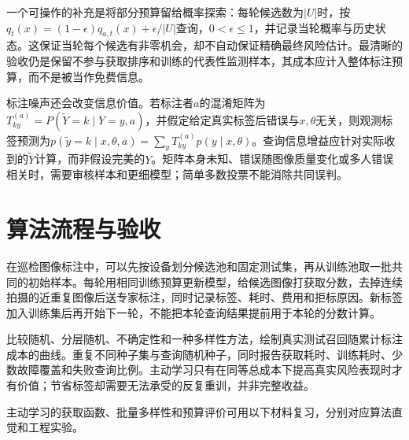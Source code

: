 一个可操作的补充是将部分预算留给概率探索：每轮候选数为$|U|$时，按$q_t(x)=(1-\epsilon)q_{a,t}(x)+\epsilon/|U|$查询，$0<\epsilon\leq1$，并记录当轮概率与历史状态。这保证当轮每个候选有非零机会，却不自动保证精确最终风险估计。最清晰的验收仍是保留不参与获取排序和训练的代表性监测样本，其成本应计入整体标注预算，而不是被当作免费信息。

标注噪声还会改变信息价值。若标注者$a$的混淆矩阵为$T^{(a)}_{ky}=P(\widetilde Y=k\mid Y=y,a)$，并假定给定真实标签后错误与$x,\theta$无关，则观测标签预测为$p(\widetilde y=k\mid x,\theta,a)=\sum_yT^{(a)}_{ky}p(y\mid x,\theta)$。查询信息增益应针对实际收到的$\widetilde Y$计算，而非假设完美的$Y$。矩阵本身未知、错误随图像质量变化或多人错误相关时，需要审核样本和更细模型；简单多数投票不能消除共同误判。

\section{算法流程与验收}
在巡检图像标注中，可以先按设备划分候选池和固定测试集，再从训练池取一批共同的初始样本。每轮用相同训练预算更新模型，给候选图像打获取分数，去掉连续拍摄的近重复图像后送专家标注，同时记录标签、耗时、费用和拒标原因。新标签加入训练集后再开始下一轮，不能把本轮查询结果提前用于本轮的分数计算。

比较随机、分层随机、不确定性和一种多样性方法，绘制真实测试召回随累计标注成本的曲线。重复不同种子集与查询随机种子，同时报告获取耗时、训练耗时、少数故障覆盖和失败查询比例。主动学习只有在同等总成本下提高真实风险表现时才有价值；节省标签却需要无法承受的反复重训，并非完整收益。

主动学习的获取函数、批量多样性和预算评价可用以下材料复习，分别对应算法直觉和工程实验。
